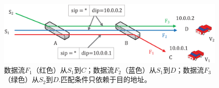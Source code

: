 %
%



\begin{figure} [t]
\begin{center}
\includegraphics[width=1\columnwidth]{figures/fig-6-31.eps}
\caption{数据流$F_{1}$（红色）从$S_{1}$到$C$；数据流$F_{2}$（蓝色）从$S_{1}$到$D$；数据流$F_{3}$（绿色）从$S_{2}$到$D$.匹配条件只依赖于目的地址。} \label{fig6}
\end{center}
\vspace{-0.3in}
\end{figure}



